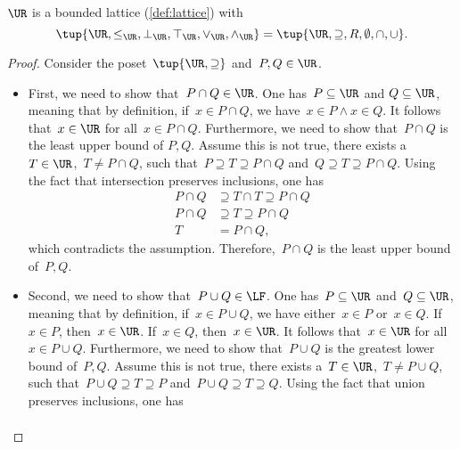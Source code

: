 
\begin{lemma}
  \label{lem:u_bounded_lat}
  $\UR$ is a bounded lattice (\cref{def:lattice}) with
  \begin{equation}
    \tup{\UR,\leq_{\UR},\bot_{\UR},\top_{\UR},\vee_{\UR},\wedge_{\UR}}=\tup{\UR,\supseteq,R,\emptyset,\cap,\cup}.
  \end{equation}
\end{lemma}
\begin{proof}
  Consider the poset~$\tup{\UR,\supseteq}$ and~$P,Q\in \UR$.
  \begin{itemize}
    \item First, we need to show that~$P\cap Q\in \UR$. One has~$P \subseteq \UR$ and $Q\subseteq \UR$, meaning that by definition, if~$x\in P\cap Q$, we have~$x\in P \wedge x\in Q$. It follows that~$x\in \UR$ for all~$x\in P\cap Q$. Furthermore, we need to show that~$P\cap Q$ is the least upper bound of $P,Q$. Assume this is not true, \ie  there exists a~$T\in \UR$,~$T\neq P\cap Q$, such that~$P\supseteq T\supseteq P\cap Q$ and~$Q\supseteq T\supseteq P\cap Q$. Using the fact that intersection preserves inclusions, one has
    \begin{equation}
      \begin{aligned}
        P\cap Q &\supseteq T\cap T \supseteq P\cap Q\\
        P\cap Q &\supseteq T \supseteq P\cap Q\\
        T&= P\cap Q,
      \end{aligned}
    \end{equation}
    which contradicts the assumption. Therefore,~$P\cap Q$ is the least upper bound of~$P,Q$.
    \item Second, we need to show that~$P\cup Q\in \LF$. One has~$P\subseteq \UR$ and~$Q\subseteq \UR$, meaning that by definition, if~$x\in P\cup Q$, we have either~$x\in P$ or~$x\in Q$. If~$x\in P$, then~$x\in \UR$. If~$x\in Q$, then~$x\in \UR$. It follows that~$x\in \UR$ for all~$x\in P\cup Q$. Furthermore, we need to show that~$P\cup Q$ is the greatest lower bound of~$P,Q$. Assume this is not true, \ie  there exists a~$T\in \UR$,~$T\neq P\cup Q$, such that~$P\cup Q\supseteq T\supseteq P$ and~$P\cup Q\supseteq T\supseteq Q$. Using the fact that union preserves inclusions, one has
    \begin{equation}
      \begin{aligned}

\end{aligned}
\end{equation}
\end{itemize}
\end{proof}
